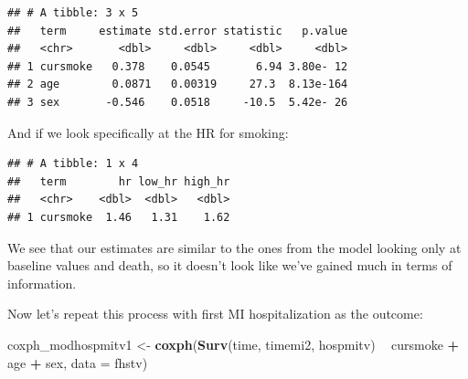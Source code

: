 \documentclass[
]{book}
\newenvironment{Shaded}{\begin{snugshade}}{\end{snugshade}}
\newcommand{\DataTypeTok}[1]{\textcolor[rgb]{0.13,0.29,0.53}{#1}}
\newcommand{\FloatTok}[1]{\textcolor[rgb]{0.00,0.00,0.81}{#1}}
\newcommand{\KeywordTok}[1]{\textcolor[rgb]{0.13,0.29,0.53}{\textbf{#1}}}
\newcommand{\NormalTok}[1]{#1}
\newcommand{\OperatorTok}[1]{\textcolor[rgb]{0.81,0.36,0.00}{\textbf{#1}}}
\newcommand{\StringTok}[1]{\textcolor[rgb]{0.31,0.60,0.02}{#1}}
\begin{document}
\begin{verbatim}
## # A tibble: 3 x 5
##   term     estimate std.error statistic   p.value
##   <chr>       <dbl>     <dbl>     <dbl>     <dbl>
## 1 cursmoke   0.378    0.0545       6.94 3.80e- 12
## 2 age        0.0871   0.00319     27.3  8.13e-164
## 3 sex       -0.546    0.0518     -10.5  5.42e- 26
\end{verbatim}

And if we look specifically at the HR for smoking:

\begin{Shaded}
\end{Shaded}

\begin{verbatim}
## # A tibble: 1 x 4
##   term        hr low_hr high_hr
##   <chr>    <dbl>  <dbl>   <dbl>
## 1 cursmoke  1.46   1.31    1.62
\end{verbatim}

We see that our estimates are similar to the ones from the model looking only at baseline values and death, so it doesn't look like we've gained much in terms of information.

Now let's repeat this process with first MI hospitalization as the outcome:

\begin{Shaded}
\begin{Highlighting}[]
\NormalTok{coxph_modhospmitv1 <-}\StringTok{ }\KeywordTok{coxph}\NormalTok{(}\KeywordTok{Surv}\NormalTok{(time, timemi2, hospmitv) }\OperatorTok{~}\StringTok{ }
\StringTok{                              }\NormalTok{cursmoke }\OperatorTok{+}\StringTok{ }\NormalTok{age }\OperatorTok{+}\StringTok{ }\NormalTok{sex, }\DataTypeTok{data =}\NormalTok{ fhstv)}
\end{Highlighting}
\end{Shaded}
\end{document}
